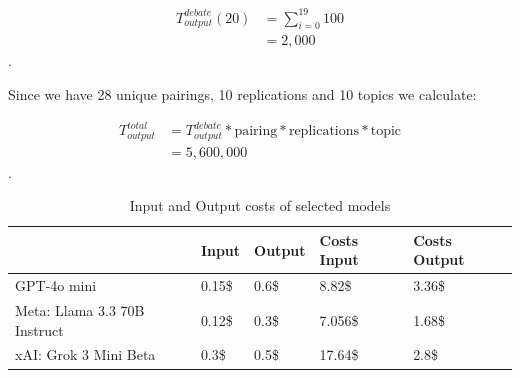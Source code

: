 \documentclass[12pt]{article}
\begin{document}
\begin{multicols}{2}
\begin{align*}
    T^{debate}_{output}(20) &= \sum_{i=0}^{19}100 \\ %
    &= 2{,}000
\end{align*}.

Since we have 28 unique pairings, 10 replications and 10 topics we calculate:

\begin{align*}
    T^{total}_{output} &= T^{debate}_{output} * \text{pairing} *\text{replications} * \text{topic} \\
    &= 5,600,000
\end{align*}.
\end{multicols}


    
\begin{table}[ht!]
\begin{center}

\begin{tabular}{|l|l|l|l|l|}
\hline
                             & Input & Output & Costs Input & Costs Output   \\ \hline
GPT-4o mini                  & 0.15\$  & 0.6\$ & 8.82\$ & 3.36\$   \\\hline
Meta: Llama 3.3 70B Instruct & 0.12\$  & 0.3\$ & 7.056\$ & 1.68\$   \\\hline
xAI: Grok 3 Mini Beta        & 0.3\$   & 0.5\$ & 17.64\$ & 2.8\$ \\ \hline
\end{tabular}
\caption{Input and Output costs of selected models}
\end{center}

\end{table}





\begin{multicols}{2}
    







\end{multicols}
\end{document}
